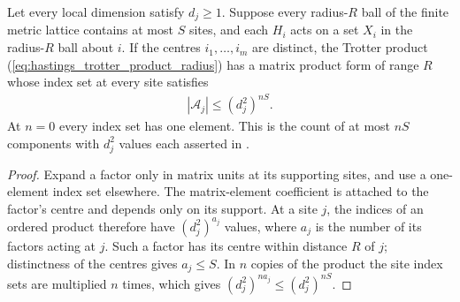 \begin{lemma}
    \label{thm:hastings_trotter_index_count}
    \leanok
    Let every local dimension satisfy $d_j\ge1$. Suppose every radius-$R$ ball
    of the finite metric lattice contains at most $S$ sites, and each
    $H_i$ acts on a set $X_i$ in the radius-$R$ ball about $i$.
    If the centres $i_1,\ldots,i_m$ are distinct, the Trotter product
    (\ref{eq:hastings_trotter_product_radius}) has a matrix product form of
    range $R$ whose index set at every site satisfies
    \begin{align}
        |\mathcal A_j|\le(d_j^2)^{nS}.
        \label{eq:hastings_trotter_index_count}
    \end{align}
    At $n=0$ every index set has one element. This is the count of at most
    $nS$ components with $d_j^2$ values each asserted in
    \cite[lines 1068--1075]{Hastings2006Solving}.
\end{lemma}
\begin{proof}\leanok
    Expand a factor only in matrix units at its supporting sites, and use a
    one-element index set elsewhere. The matrix-element coefficient is
    attached to the factor's centre and depends only on its support.
    At a site $j$, the indices of an ordered product therefore have
    $(d_j^2)^{a_j}$ values, where $a_j$ is the number of its factors acting
    at $j$. Such a factor has its centre within distance $R$ of $j$;
    distinctness of the centres gives $a_j\le S$.
    In $n$ copies of the product the site index sets are multiplied $n$
    times, which gives $(d_j^2)^{na_j}\le(d_j^2)^{nS}$.
\end{proof}

